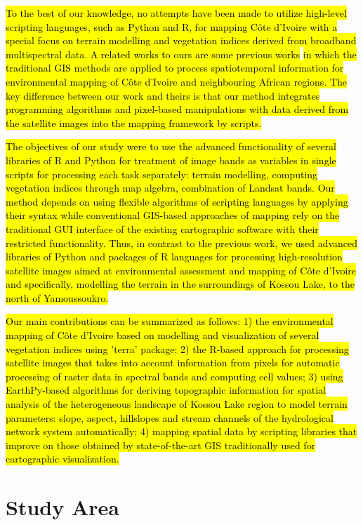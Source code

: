 \documentclass[jimaging,article,submit,pdftex,moreauthors]{Definitions/mdpi}
\begin{document}
\hl{To the best of our knowledge, no attempts have been made to utilize high-level scripting languages, such as Python and R, for mapping C\^ote d'Ivoire with a special focus on terrain modelling and vegetation indices derived from broadband multispectral data. A related works to ours are some previous works} \cite{Chatelainetal2010,Hennenberg,ElShahat,Tangetal2016,Affianetal2009} \hl{in which the traditional GIS methods are applied to process spatiotemporal information for environmental mapping of C\^ote d'Ivoire and neighbouring African regions. The key difference between our work and theirs is that our method integrates programming algorithms and pixel-based manipulations with data derived from the satellite images into the mapping framework by scripts.}

\hl{The objectives of our study were to use the advanced functionality of several libraries of R and Python for treatment of image bands as variables in single scripts for processing each task separately: terrain modelling, computing vegetation indices through map algebra, combination of Landsat bands. Our method depends on using flexible algorithms of scripting languages by applying their syntax while conventional GIS-based approaches of mapping rely on the traditional GUI interface of the existing cartographic software with their restricted functionality. Thus, in contrast to the previous work, we used advanced libraries of Python and packages of R languages for processing high-resolution satellite images aimed at environmental assessment and mapping of C\^ote d'Ivoire and specifically, modelling the terrain in the surroundings of Kossou Lake, to the north of Yamoussoukro.}

\hl{Our main contributions can be summarized as follows: 1) the environmental mapping of C\^ote d'Ivoire based on modelling and visualization of several vegetation indices using 'terra' package; 2) the R-based approach for processing satellite images that takes into account information from pixels for automatic processing of raster data in spectral bands and computing cell values; 3) using EarthPy-based algorithms for deriving topographic information for spatial analysis of the heterogeneous landscape of Kossou Lake region to model terrain parameters: slope, aspect, hillslopes and stream channels of the hydrological network system automatically; 4) mapping spatial data by scripting libraries that improve on those obtained by state-of-the-art GIS traditionally used for cartographic visualization.} 

\section{Study Area}
\end{document}
